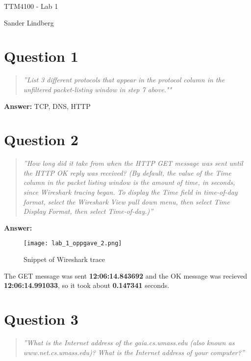 \documentclass[12pt,a4paper]{article}
\begin{document}
\begin{titlepage}
    \centering
    \vspace*{\fill}

    \vspace*{0.5cm}

    \huge
    TTM4100 - Lab 1

    \vspace*{0.5cm}

    \large Sander Lindberg

    \vspace*{\fill}
    \end{titlepage}

	\newpage
	
	\section{Question 1}
		\begin{quote}
			\textit{
				''List 3 different protocols that appear in the protocol column in the unfiltered
				packet-listing window in step 7 above.""			
			}
		\end{quote}
		
		\textbf{Answer: } TCP, DNS, HTTP
		
	\section{Question 2}
		\begin{quote}
			\textit{
				''How long did it take from when the HTTP GET message was sent until the
				HTTP OK reply was received? (By default, the value of the Time column in the
				packet listing window is the amount of time, in seconds, since Wireshark
				tracing began. To display the Time field in time-of-day format, select the
				Wireshark View pull down menu, then select Time Display Format, then select
				Time-of-day.)''			
			}
		\end{quote}
	
		\textbf{Answer: } 
		\begin{figure}[hb!]
			\centering
			\texttt{[image: lab\_1\_oppgave\_2.png]}
			\caption{Snippet of Wireshark trace}
			\label{fig:oppgave2}
		\end{figure}
		
		The GET message was sent \textbf{12:06:14.843692} and the OK message was recieved \textbf{12:06:14.991033}, so it took about \textbf{0.147341} 			seconds.
		
	\section{Question 3}
		\begin{quote}
			\textit{
				''What is the Internet address of the gaia.cs.umass.edu (also known as
				www.net.cs.umass.edu)? What is the Internet address of your computer?''				
			}
		\end{quote}
			
\end{document}
